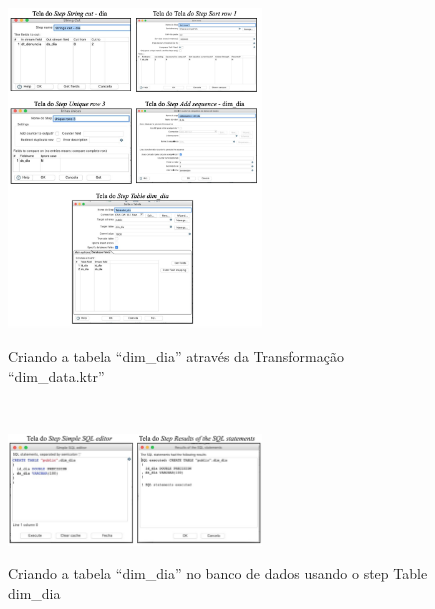\begin{figure}[H]
	\vspace*{0,2cm}
    \centering
    \caption{Criando a tabela ``dim\_dia'' atrav\'{e}s da Transforma\c{c}\~{a}o ``dim\_data.ktr''}
    \includegraphics[width=0.6\textwidth]{./04-figuras/figura-dim-dia}
    \label{fig:ilustfigdimdia}
\end{figure}
\vspace*{-0,9cm}
{\raggedright {}} \\

\begin{figure}[H]
	\vspace*{0,2cm}
    \centering
    \caption{Criando a tabela ``dim\_dia'' no banco de dados usando o step Table dim\_dia}
    \includegraphics[width=0.6\textwidth]{./04-figuras/figura-tb-dim-dia}
    \label{fig:ilustfigtbdimdia}
\end{figure}
\vspace*{-0,9cm}
{\raggedright {}} \\

